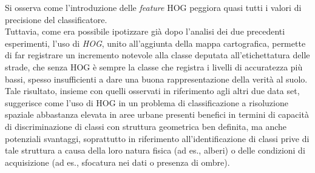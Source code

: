 Si osserva come l'introduzione delle \emph{feature} HOG peggiora quasi
tutti i valori di precisione del classificatore.\\

Tuttavia, come era possibile ipotizzare già dopo l'analisi dei due
precedenti esperimenti, l'uso di \emph{HOG}, unito all'aggiunta della
mappa cartografica, permette di far registrare un incremento notevole
alla classe deputata all'etichettatura delle strade, che senza HOG è
sempre la classe che registra i livelli di accuratezza più bassi,
spesso insufficienti a dare una buona rappresentazione della verità al
suolo. Tale risultato, insieme con quelli osservati in riferimento
agli altri due data set, suggerisce come l'uso di HOG in un problema
di classificazione a risoluzione spaziale abbastanza elevata in aree
urbane presenti benefici in termini di capacità di discriminazione di
classi con struttura geometrica ben definita, ma anche potenziali
svantaggi, soprattutto in riferimento all'identificazione di classi
prive di tale struttura a causa della loro natura fisica (ad es.,
alberi) o delle condizioni di acquisizione (ad es., sfocatura nei dati
o presenza di ombre).


